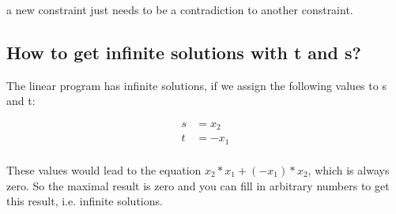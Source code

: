 \documentclass[%
   10pt,              %
   nenglish,           %
   a4paper,           %
   DIV11,             %
]{scrartcl}%
\begin{document}
\noindent a new constraint just needs to be a contradiction to another constraint.
	
\subsection*{How to get infinite solutions with t and s?}
The linear program has infinite solutions, if we assign the following values to s and t:








\begin{align}
 s &= x_2 \nonumber \\
 t &= -x_1 \nonumber \\
\end{align}

\noindent These values would lead to the equation $x_2*x_1 + (-x_1)*x_2$, which is always zero. So 
the maximal result is zero and you can fill in arbitrary numbers to get this result, i.e. infinite 
solutions.
\end{document}
